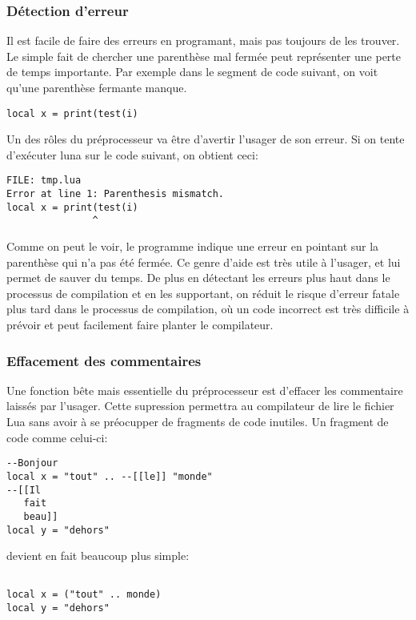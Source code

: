 \documentclass{article}
\begin{document}
\subsubsection{Détection d'erreur}
Il est facile de faire des erreurs en programant, mais pas toujours de les trouver. Le simple fait de chercher une parenthèse mal fermée peut représenter une perte de temps importante. Par exemple dans le segment de code suivant, on voit qu'une parenthèse fermante manque.
\lstset{style = lua}
\begin{lstlisting}[caption={Mauvais parenthèsage},label=DescriptiveLabel]
  local x = print(test(i)
\end{lstlisting}

Un des rôles du préprocesseur va être d'avertir l'usager de son erreur. Si on tente d'exécuter luna sur le code suivant, on obtient ceci:
\lstset{style = out}
\begin{lstlisting}
FILE: tmp.lua
Error at line 1: Parenthesis mismatch.
local x = print(test(i)
               ^
\end{lstlisting}
Comme on peut le voir, le programme indique une erreur en pointant sur la parenthèse qui n'a pas été fermée. Ce genre d'aide est très utile à l'usager, et lui permet de sauver du temps. De plus en détectant les erreurs plus haut dans le processus de compilation et en les supportant, on réduit le risque d'erreur fatale plus tard dans le processus de compilation, où un code incorrect est très difficile à prévoir et peut facilement faire planter le compilateur.

\subsubsection{Effacement des commentaires}
Une fonction bête mais essentielle du préprocesseur est d'effacer les commentaire laissés par l'usager. Cette supression permettra au compilateur de lire le fichier Lua sans avoir à se préocupper de fragments de code inutiles. Un fragment de code comme celui-ci:
\lstset{style = lua}
\begin{lstlisting}[caption={Commentaires multiples},label=DescriptiveLabel]
--Bonjour
local x = "tout" .. --[[le]] "monde"
--[[Il
   fait
   beau]]
local y = "dehors"
\end{lstlisting}

\newpage
devient en fait beaucoup plus simple:
\begin{lstlisting}[belowcaptionskip = -1\baselineskip]

local x = ("tout" .. monde) 
local y = "dehors"
\end{lstlisting}
\end{document}
